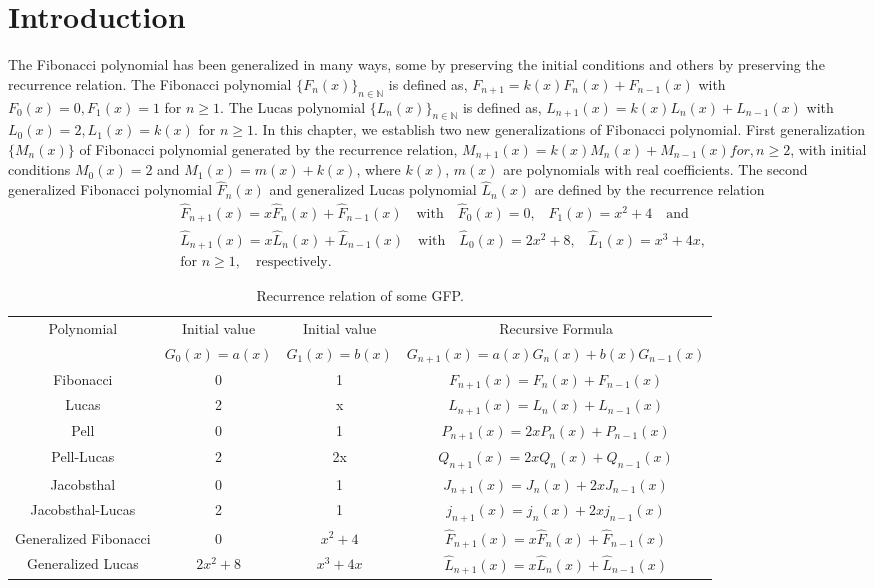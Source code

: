 \section{Introduction}
The Fibonacci polynomial has been generalized in many ways, some by preserving the initial conditions and others by preserving the recurrence relation. The Fibonacci polynomial $\{F_{n}(x)\}_{n\in\mathbb{N}}$  is defined as,
 $F_{n+1}=k(x)F_{n}(x)+F_{n-1}(x) $ with $F_{0}(x)=0 ,F_{1}(x)=1 $ for $n\geq{1}$. The Lucas polynomial $\{L_{n}(x)\}_{n\in\mathbb{N}}$  is defined as, $L_{n+1}(x)=k(x)L_{n}(x)+L_{n-1}(x)$ with $L_{0}(x)=2 ,L_{1}(x)=k(x)$ for $n\geq{1}$.
In this chapter, we establish two new generalizations of Fibonacci polynomial. First generalization  $\{M_{n}(x)\}$ of Fibonacci polynomial  generated by the recurrence relation, $M_{n+1}(x)=k(x)M_{n}(x)+M_{n-1}(x)for, n\geq{2}$, with initial conditions $M_{0}(x)=2$ and $M_{1}(x)=m(x)+k(x)$, where $k(x)$, $m(x)$ are polynomials with real coefficients. The second generalized Fibonacci polynomial $\widehat{F}_{ n}(x)$ and generalized Lucas polynomial $\widehat{L}_{ n}(x)$ are defined by the recurrence relation 
\begin{align*}
&\widehat{F}_{ n+1}(x)=x\widehat{F}_{n}(x)+\widehat{F}_{ n-1}(x) \quad\text{with} \quad \widehat{F}_{ 0}(x)=0\text{,}\quad \widehat{F}_{1}(x)=x^2+4\quad \text{and}\\
&\widehat{L}_{ n+1}(x)=x \widehat{L}_{ n}(x)+\widehat{L}_{ n-1}(x) \quad\text{with} \quad \widehat{L}_{ 0}(x)=2x^2+8\text{,}\quad \widehat{L}_{ 1}(x)=x^3+4x,\\&\text{for } n\geq{1},\quad \text{respectively}.
\end{align*}
\begin{table}[H]
\begin{center}
\begin{tabular} {|c|c|c|c|}\hline \label{d}
Polynomial &Initial value &Initial value &Recursive Formula \\
&$G_0(x)=a(x)$&$G_1(x)=b(x)$&$G_{n+1}(x)=a(x)G_{n}(x)+b(x)G_{n-1}(x)$\\\hline\hline
Fibonacci&0&1&$F_{n+1}(x) = F_{n}(x)+F_{n-1}(x)$\\
Lucas&2&x&$L_{n+1}(x) = L_{n}(x)+L_{n-1}(x)$\\
Pell&0&1&$P_{n+1}(x) = 2xP_{n}(x)+P_{n-1}(x)$\\
Pell-Lucas&2&2x&$Q_{n+1}(x) = 2xQ_{n}(x)+Q_{n-1}(x)$\\
Jacobsthal&0&1&$J_{n+1}(x) = J_{n}(x)+2xJ_{n-1}(x)$\\
Jacobsthal-Lucas&2&1&$j_{n+1}(x) = j_{n}(x)+2xj_{n-1}(x)$\\
Generalized Fibonacci&0&$x^2+4$&$\widehat{F}_{n+1}(x)=x \widehat{F}_{ n}(x)+\widehat{F}_{ n-1}(x)$\\
Generalized Lucas&$2x^2+8$&$x^3+4x$&$\widehat{L}_{n+1}(x)=x \widehat{L}_{n}(x)+\widehat{L}_{ n-1}(x)$\\
\hline
\end{tabular} 
\caption{{Recurrence relation of some GFP.}}
\label{Tab1} 
\end{center}
\end{table}
\vspace{3mm}
